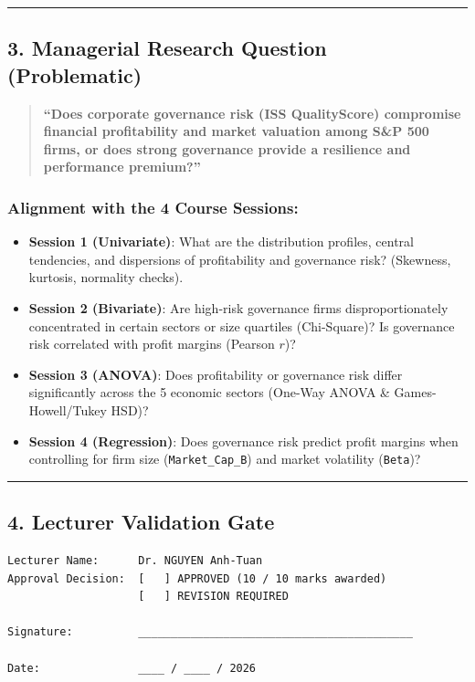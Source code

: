 \documentclass[
]{article}
\providecommand{\tightlist}{%
  \setlength{\itemsep}{0pt}\setlength{\parskip}{0pt}}
\begin{document}
\begin{center}\rule{0.5\linewidth}{0.5pt}\end{center}

\subsection{3. Managerial Research Question
(Problematic)}\label{managerial-research-question-problematic}

\begin{quote}
\textbf{``Does corporate governance risk (ISS QualityScore) compromise
financial profitability and market valuation among S\&P 500 firms, or
does strong governance provide a resilience and performance premium?''}
\end{quote}

\subsubsection{Alignment with the 4 Course
Sessions:}\label{alignment-with-the-4-course-sessions}

\begin{itemize}
\tightlist
\item
  \textbf{Session 1 (Univariate)}: What are the distribution profiles,
  central tendencies, and dispersions of profitability and governance
  risk? (Skewness, kurtosis, normality checks).
\item
  \textbf{Session 2 (Bivariate)}: Are high-risk governance firms
  disproportionately concentrated in certain sectors or size quartiles
  (Chi-Square)? Is governance risk correlated with profit margins
  (Pearson \(r\))?
\item
  \textbf{Session 3 (ANOVA)}: Does profitability or governance risk
  differ significantly across the 5 economic sectors (One-Way ANOVA \&
  Games-Howell/Tukey HSD)?
\item
  \textbf{Session 4 (Regression)}: Does governance risk predict profit
  margins when controlling for firm size (\texttt{Market\_Cap\_B}) and
  market volatility (\texttt{Beta})?
\end{itemize}

\begin{center}\rule{0.5\linewidth}{0.5pt}\end{center}

\subsection{4. Lecturer Validation Gate}\label{lecturer-validation-gate}

\begin{verbatim}
Lecturer Name:      Dr. NGUYEN Anh-Tuan
Approval Decision:  [   ] APPROVED (10 / 10 marks awarded)
                    [   ] REVISION REQUIRED

Signature:          __________________________________________

Date:               ____ / ____ / 2026
\end{verbatim}
\end{document}

